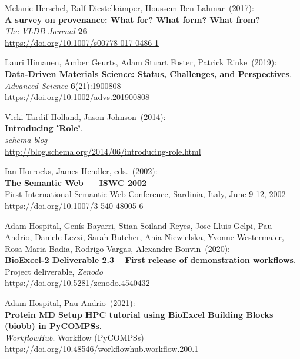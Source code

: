 \begin{thebibliography}{9}
Melanie Herschel, Ralf Diestelkämper, Houssem Ben Lahmar~(2017): \\
\textbf{A survey on provenance: What for? What form? What from?}\\
\emph{The VLDB Journal} \textbf{26}\\
\url{https://doi.org/10.1007/s00778-017-0486-1}

Lauri Himanen, Amber Geurts, Adam Stuart Foster, Patrick Rinke~(2019): \\
\textbf{Data-Driven Materials Science: Status, Challenges, and Perspectives}.\\
\emph{Advanced Science} \textbf{6}(21):1900808\\
\url{https://doi.org/10.1002/advs.201900808}

Vicki Tardif Holland, Jason Johnson~(2014): \\
\textbf{Introducing '{Role}'}.\\
\emph{schema blog}\\
\url{http://blog.schema.org/2014/06/introducing-role.html}

Ian Horrocks, James Hendler, eds.~(2002): \\
\textbf{The {Semantic Web} --- {ISWC} 2002} \\
First International Semantic Web Conference, Sardinia, Italy, June 9-12, 2002\\
\url{https://doi.org/10.1007/3-540-48005-6}

Adam Hospital, Genís Bayarri, Stian Soiland-Reyes, Jose Lluis
Gelpi, Pau Andrio, Daniele Lezzi, Sarah Butcher, Ania Niewielska, Yvonne
Westermaier, Rosa Maria Badia, Rodrigo Vargas, Alexandre Bonvin~(2020): \\
\textbf{BioExcel-2 Deliverable 2.3 -- First release of demonstration workflows}.\\
Project deliverable, \emph{Zenodo}\\
\url{https://doi.org/10.5281/zenodo.4540432}

Adam Hospital, Pau Andrio~(2021): \\
\textbf{Protein MD Setup HPC tutorial using BioExcel Building Blocks (biobb) in PyCOMPSs}.\\
\emph{WorkflowHub}. Workflow (PyCOMPSs)\\
\url{https://doi.org/10.48546/workflowhub.workflow.200.1}


\end{thebibliography}
